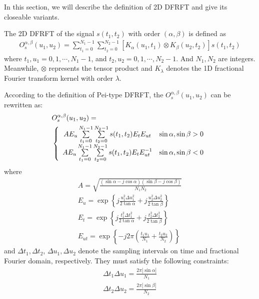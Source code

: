 \documentclass[conference]{IEEEtran}
\begin{document}
In this section, we will describe the definition of 2D DFRFT and give its closeable variants. 

The 2D DFRFT of the signal $s({t_1}, {t_2})$ with order $(\alpha,\beta)$ is defined as
\begin{align}
     O_s^{\alpha ,\beta }({u_1},{u_2}) = \sum\limits_{{t_1} = 0}^{{N_1} - 1} {\sum\limits_{{t_2} = 0}^{{N_2} - 1} {[{K_\alpha }({u_1},{t_1}) \otimes {K_\beta }({u_2},{t_2})]} } s({t_1},{t_2})
\end{align} 
where ${t_1},{u_1} = 0,1, \cdots, N_1-1$, and ${t_2},{u_2} = 0,1, \cdots, N_2-1$. And $N_1,N_2$ are integers. Meanwhile, $\otimes $ represents the tensor product and ${K_\lambda}$ denotes the 1D fractional Fourier transform kernel with order $\lambda $.

According to the definition of Pei-type DFRFT, the $O_s^{\alpha ,\beta }({u_1},{u_2})$ can be rewritten as:
\begin{align} \label{2D DFRFT}
      &O_s^{\alpha ,\beta }({u_1},{u_2}) = \notag \\
      &\left\{ {\begin{array}{*{20}{c}}
      		{A{E_u}\sum\limits_{{t_1} = 0}^{{N_1} - 1} {\sum\limits_{{t_2} = 0}^{{N_2} - 1} {s({t_1},{t_2})} } {E_t}{E_{ut}}}&{\sin \alpha ,\sin \beta  > 0}\\
      		{A{E_u}\sum\limits_{{t_1} = 0}^{{N_1} - 1} {\sum\limits_{{t_2} = 0}^{{N_2} - 1} {s({t_1},{t_2})} } {E_t}E_{ut}^{ - 1}}&{\sin \alpha ,\sin \beta  < 0}
      \end{array}} \right.
\end{align}
where 
\begin{align}
	A =  \sqrt {\frac{{(\sin \alpha  - j\cos \alpha )(\sin \beta  - j\cos \beta )}}{{{N_1}{N_2}}}}\\
	{E_u} =  \exp \left\{ j\frac{{u_1^2\Delta u_1^2}}{{2\tan \alpha }} + j\frac{{u_2^2\Delta u_2^2}}{{2\tan \beta }}\right \}\\
	{E_t} =  \exp  \left\{ j\frac{{t_1^2\Delta t_1^2}}{{2\tan \alpha }} + j\frac{{t_2^2\Delta t_2^2}}{{2\tan \beta }}\right\} \\
	{E_{ut}} =  \exp\left \{  - j2\pi (\frac{{{t_1}{u_1}}}{{{N_1}}} + \frac{{{t_2}{u_2}}}{{{N_2}}})\right\} 
\end{align}
and $\Delta {t_1},\Delta {t_2}$, $\Delta {u_1},\Delta {u_2}$ denote the sampling intervals on time and  fractional Fourier domain, respectively. They must satisfy the following constraints:
\begin{align} 
	\Delta {t_1}\Delta {u_1} = \frac{{2\pi \left| {\sin \alpha } \right|}}{{{N_1}}} \\
	\Delta {t_2}\Delta {u_2} = \frac{{2\pi \left| {\sin \beta } \right|}}{{{N_2}}}
\end{align}
\end{document}
